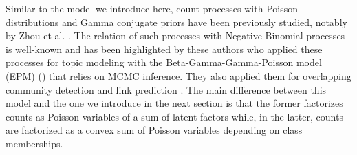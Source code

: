 Similar to the model we introduce here, count processes with Poisson distributions and Gamma conjugate priors have been previously studied, notably by Zhou et al. \cite{zhou2012augment, zhou2015negative}. The relation of such processes with Negative Binomial processes is well-known and has been highlighted by these authors who applied  these processes for topic modeling with the Beta-Gamma-Gamma-Poisson model (EPM) (\cite{zhou2012beta}) that relies on MCMC inference. They also applied them for overlapping community detection and link prediction \cite{zhou2015}. The main difference between this model and the one we introduce in the next section is that the former factorizes counts as Poisson variables of a sum of latent factors while, in the latter, counts are factorized as a convex sum of Poisson variables depending on class memberships.


%
%
%
%
%
%
%

